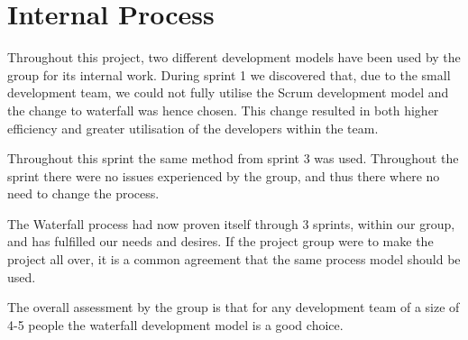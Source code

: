 \section{Internal Process}
Throughout this project, two different development models have been used by the group for its internal work.
During sprint 1 we discovered that, due to the small development team, we could not fully utilise the Scrum development model and the change to waterfall was hence chosen. 
This change resulted in both higher efficiency and greater utilisation of the developers within the team.

Throughout this sprint the same method from sprint 3 was used.
Throughout the sprint there were no issues experienced by the group, and thus there where no need to change the process. 

The Waterfall process had now proven itself through 3 sprints, within our group, and has fulfilled our needs and desires.
If the project group were to make the project all over, it is a common agreement that the same process model should be used. 

The overall assessment by the group is that for any development team of a size of 4-5 people the waterfall development model is a good choice. 

